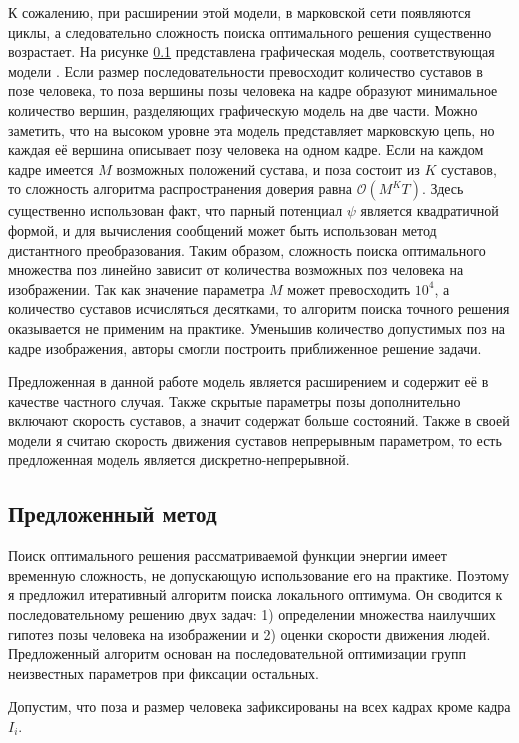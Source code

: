 К сожалению, при расширении этой модели, в марковской сети появляются циклы, а следовательно сложность поиска оптимального решения существенно возрастает. На рисунке \ref{} представлена графическая модель, соответствующая модели \cite{park2011n}. Если размер последовательности превосходит количество суставов в позе человека, то поза вершины позы человека на кадре образуют минимальное количество вершин, разделяющих графическую модель на две части. Можно заметить, что на высоком уровне эта модель представляет марковскую цепь, но каждая её вершина описывает позу человека на одном кадре. Если на каждом кадре имеется $M$ возможных положений сустава, и поза состоит из $K$ суставов, то сложность алгоритма распространения доверия равна $\mathcal{O}(M^{K}T)$. Здесь существенно использован факт, что парный потенциал $\psi$ является квадратичной формой, и для вычисления сообщений может быть использован метод дистантного преобразования. Таким образом, сложность поиска оптимального множества поз линейно зависит от количества возможных поз человека на изображении. Так как значение параметра $M$ может превосходить $10^4$, а количество суставов исчисляться десятками, то алгоритм поиска точного решения оказывается не применим на практике. Уменьшив количество допустимых поз на кадре изображения, авторы \cite{park2011n} смогли построить приближенное решение задачи.

Предложенная в данной работе модель является расширением \cite{park2011n} и содержит её в качестве частного случая. Также скрытые параметры позы дополнительно включают скорость суставов, а значит содержат больше состояний. Также в своей модели я считаю скорость движения суставов непрерывным параметром, то есть предложенная модель является дискретно-непрерывной.

\subsection{Предложенный метод}

Поиск оптимального решения рассматриваемой функции энергии имеет временную сложность, не допускающую использование его на практике. Поэтому я предложил итеративный алгоритм поиска локального оптимума. Он сводится к последовательному решению двух задач: 1) определении множества наилучших гипотез позы человека на изображении и 2) оценки скорости движения людей. Предложенный алгоритм основан на последовательной оптимизации групп неизвестных параметров при фиксации остальных.

Допустим, что поза и размер человека зафиксированы на всех кадрах кроме кадра $I_i$.

